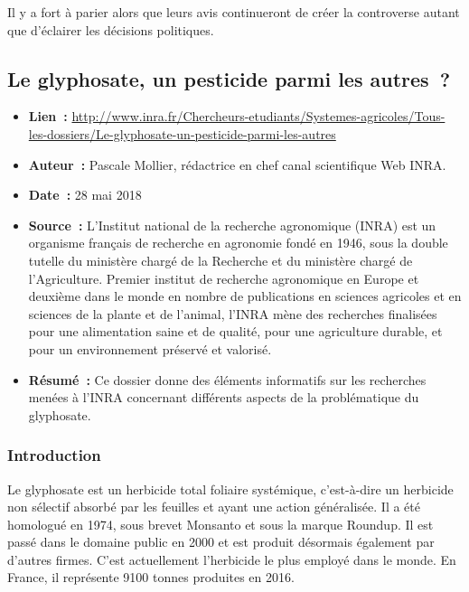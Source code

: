 \documentclass[8pt]{article}
\begin{document}
Il y a fort à parier alors que leurs avis continueront de créer la controverse autant que d’éclairer les décisions politiques.

\newpage
\subsection{Le glyphosate, un pesticide parmi les autres~?}
\label{sec:pesticide}

\begin{itemize}
	\item \textbf{Lien~: }  \url{http://www.inra.fr/Chercheurs-etudiants/Systemes-agricoles/Tous-les-dossiers/Le-glyphosate-un-pesticide-parmi-les-autres} 
	\item \textbf{Auteur~: }  Pascale Mollier, rédactrice en chef canal scientifique Web INRA.
	\item \textbf{Date~: } 28 mai 2018
	\item \textbf{Source~: } L'Institut national de la recherche agronomique (INRA) est un organisme français de recherche en agronomie fondé en 1946, sous la double tutelle du ministère chargé de la Recherche et du ministère chargé de l’Agriculture.
	Premier institut de recherche agronomique en Europe et deuxième dans le monde en nombre de publications en sciences agricoles et en sciences de la plante et de l'animal, l'INRA mène des recherches finalisées pour une alimentation saine et de qualité, pour une agriculture durable, et pour un environnement préservé et valorisé. 
	\item \textbf{Résumé~: } Ce dossier donne des éléments informatifs sur les recherches menées à l’INRA concernant différents aspects de la problématique du glyphosate.
\end{itemize}

\subsubsection{Introduction}

Le glyphosate est un herbicide total foliaire systémique, c’est-à-dire un herbicide non sélectif absorbé par les feuilles et ayant une action généralisée. Il a été homologué en 1974, sous brevet Monsanto et sous la marque Roundup. Il est passé dans le domaine public en 2000 et est produit désormais également par d’autres firmes. C’est actuellement l’herbicide le plus employé dans le monde. En France, il représente 9100 tonnes produites en 2016.\\
\end{document}
